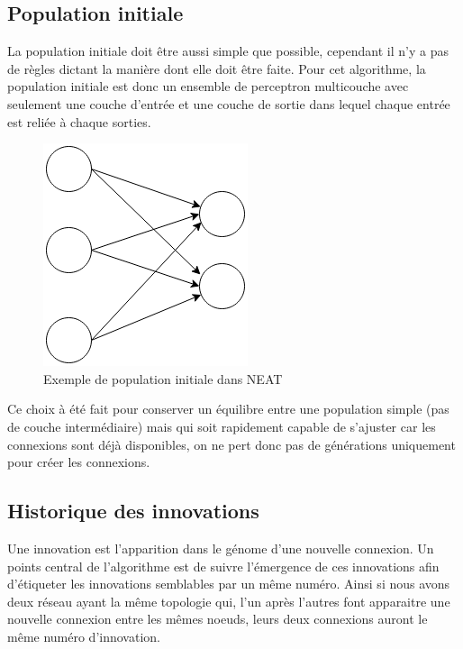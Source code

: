 \documentclass{article}
\begin{document}
\subsection{Population initiale}

La population initiale doit être aussi simple que possible, cependant il n'y a pas de règles dictant la manière dont elle doit être faite. Pour cet algorithme, la population initiale est donc un ensemble de perceptron multicouche avec seulement une couche d'entrée et une couche de sortie dans lequel chaque entrée est reliée à chaque sorties.

\begin{figure}[H]
\begin{center}
	\includegraphics[scale=0.6]{initneat.png}
	\caption{Exemple de population initiale dans NEAT}
\end{center}
\end{figure}

Ce choix à été fait pour conserver un équilibre entre une population simple (pas de couche intermédiaire) mais qui soit rapidement capable de s'ajuster car les connexions sont déjà disponibles, on ne pert donc pas de générations uniquement pour créer les connexions.

\subsection{Historique des innovations}

Une innovation est l'apparition dans le génome d'une nouvelle connexion. Un points central de l'algorithme est de suivre l'émergence de ces innovations afin d'étiqueter les innovations semblables par un même numéro. Ainsi si nous avons deux réseau ayant la même topologie qui, l'un après l'autres font apparaitre une nouvelle connexion entre les mêmes noeuds, leurs deux connexions auront le même numéro d'innovation.\\
	
\end{document}
